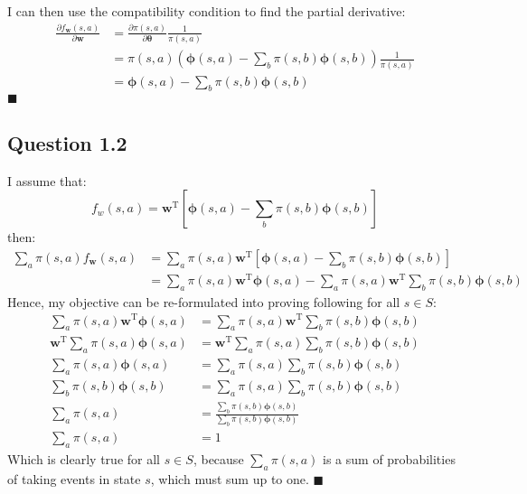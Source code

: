 \documentclass[a4paper]{article}
\newcommand*{\QEDA}{\hfill\ensuremath{\blacksquare}}%
\newcommand*{\bs}[1]{\boldsymbol{#1}}
\begin{document}
I can then use the compatibility condition to find the partial derivative:
\begin{align*}
  \frac{\partial f_{\boldsymbol{w}}(s, a)}{\partial \boldsymbol{w}}
    &=\frac{\partial \pi(s, a)}{\partial \boldsymbol{\theta}} \frac{1}{\pi(s, a)}\\
    &= \pi(s, a)\left(\boldsymbol{\phi}(s, a)-\sum_{b}\pi(s, b)\boldsymbol{\phi}(s, b)\right)
  \frac{1}{\pi(s, a)}\\
  &=\boldsymbol{\phi}(s, a)-\sum_{b}\pi(s, b)\boldsymbol{\phi}(s, b)
\end{align*}
\QEDA

\subsection*{Question 1.2}
\label{subsec:12}
I assume that:
\[
f_{w}(s, a)=\boldsymbol{w}^{\mathrm{T}}\left[\bs{\phi}(s, a)-\sum_{b} \pi(s, b) \bs{\phi}(s, b)\right]
\]
then:
\begin{align*}
  \sum_{a} \pi(s, a) f_{\boldsymbol{w}}(s, a)
  &=
  \sum_{a} \pi(s, a) \boldsymbol{w}^{\mathrm{T}}
  \left[\bs{\phi}(s, a)-\sum_{b} \pi(s, b) \bs{\phi}(s, b)\right]\\
  &=
  \sum_{a} \pi(s, a) \boldsymbol{w}^{\mathrm{T}}
  \bs{\phi}(s, a)-
  \sum_{a} \pi(s, a) \boldsymbol{w}^{\mathrm{T}}
  \sum_{b} \pi(s, b) \bs{\phi}(s, b)
\end{align*}
Hence, my objective can be re-formulated into proving following for all $s\in S$:
\begin{align*}
  \sum_{a} \pi(s, a) \boldsymbol{w}^{\mathrm{T}}\bs{\phi}(s, a)
  &=
  \sum_{a} \pi(s, a) \boldsymbol{w}^{\mathrm{T}}\sum_{b} \pi(s, b) \bs{\phi}(s, b)\\
  \boldsymbol{w}^{\mathrm{T}} \sum_{a} \pi(s, a) \bs{\phi}(s, a)
  &=
   \boldsymbol{w}^{\mathrm{T}}\sum_{a} \pi(s, a)\sum_{b} \pi(s, b) \bs{\phi}(s, b)\\
   \sum_{a} \pi(s, a) \bs{\phi}(s, a)
  &=
   \sum_{a} \pi(s, a)\sum_{b} \pi(s, b) \bs{\phi}(s, b)\\
   \sum_{b} \pi(s, b) \bs{\phi}(s, b)
  &=
   \sum_{a} \pi(s, a)\sum_{b} \pi(s, b) \bs{\phi}(s, b)\\
   \sum_{a} \pi(s, a)
  &=
   \frac{\sum_{b} \pi(s, b) \bs{\phi}(s, b)}{\sum_{b} \pi(s, b) \bs{\phi}(s, b)}\\
   \sum_{a}\pi(s, a) &= 1
\end{align*}
Which is clearly true for all $s \in S$, because 
   $\sum_{a}\pi(s, a)$ is a sum of probabilities of taking events in state $s$,
which must sum up to one.
\QEDA
\end{document}
